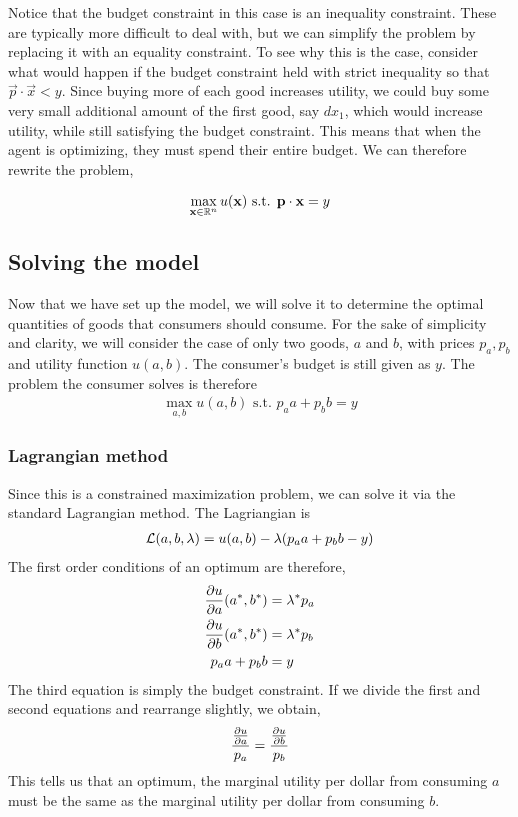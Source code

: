 Notice that the budget constraint in this case is an inequality constraint. These are typically more difficult to deal with, but we can simplify the problem by replacing it with an equality constraint. To see why this is the case, consider what would happen if the budget constraint held with strict inequality so that $\vec{p} \cdot \vec{x} < y$. Since buying more of each good increases utility, we could buy some very small additional amount of the first good, say $dx_1$, which would increase utility, while still satisfying the budget constraint. This means that when the agent is optimizing, they must spend their entire budget. We can therefore rewrite the problem,

\begin{align*}
    \max_{\mathbf{x} \in \mathbb{R}^n} u(\mathbf{x}) \text{ s.t. } \mathbf{p} \cdot \mathbf{x} = y
\end{align*}

\subsection*{Solving the model}
Now that we have set up the model, we will solve it to determine the optimal quantities of goods that consumers should consume. For the sake of simplicity and clarity, we will consider the case of only two goods, $a$ and $b$, with prices $p_a, p_b$ and utility function $u(a, b)$. The consumer's budget is still given as $y$. The problem the consumer solves is therefore
\begin{align*}
    \max_{a, b} u(a, b) \text{ s.t. } p_a a + p_b b = y
\end{align*}

\subsubsection*{Lagrangian method}
Since this is a constrained maximization problem, we can solve it via the standard Lagrangian method. The Lagriangian is
\begin{align*}
    \mathcal{L}(a, b, \lambda) = u(a, b) - \lambda(p_a a + p_b b - y)
\end{align*}
The first order conditions of an optimum are therefore,
\begin{align*}
    \frac{\partial u}{\partial a}(a^*, b^*) &= \lambda^* p_a \\
    \frac{\partial u}{\partial b}(a^*, b^*) &= \lambda^* p_b \\
    p_a a + p_b b &= y
\end{align*}
The third equation is simply the budget constraint. If we divide the first and second equations and rearrange slightly, we obtain,
\begin{align*}
    \frac{\frac{\partial u}{\partial a}}{p_a} = \frac{\frac{\partial u}{\partial b}}{p_b} 
\end{align*}
This tells us that an optimum, the marginal utility per dollar from consuming $a$ must be the same as the marginal utility per dollar from consuming $b$. 

